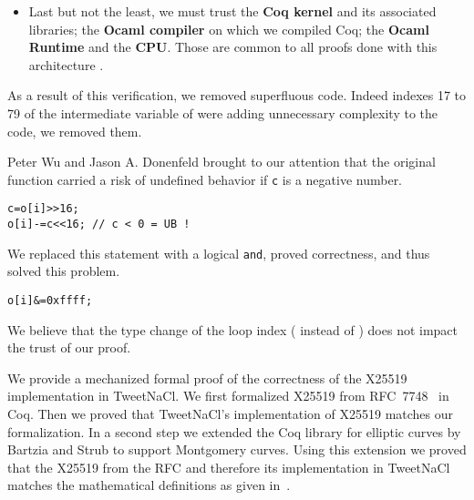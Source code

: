 \begin{itemize}
  \item Last but not the least, we must trust the \textbf{Coq kernel} and its
  associated libraries; the \textbf{Ocaml compiler} on which we compiled Coq;
  the \textbf{Ocaml Runtime} and the \textbf{CPU}. Those are common to all proofs
  done with this architecture \cite{2015-Appel,coq-faq}.
\end{itemize}

As a result of this verification, we removed superfluous code.
Indeed indexes 17 to 79 of the  intermediate variable of
 were adding unnecessary complexity to the code,
we removed them.

Peter Wu and Jason A. Donenfeld brought to our attention that the original
 function carried a risk of undefined behavior if \texttt{c}
is a negative number.
\begin{lstlisting}[language=Ctweetnacl]
c=o[i]>>16;
o[i]-=c<<16; // c < 0 = UB !
\end{lstlisting}
We replaced this statement with a logical \texttt{and}, proved correctness,
and thus solved this problem.
\begin{lstlisting}[language=Ctweetnacl]
o[i]&=0xffff;
\end{lstlisting}

We believe that the type change of the loop index ( instead of )
does not impact the trust of our proof.

We provide a mechanized formal proof of the correctness of the X25519
implementation in TweetNaCl.
We first formalized X25519 from RFC~7748~\cite{rfc7748} in Coq. Then we proved
that TweetNaCl's implementation of X25519 matches our formalization.
In a second step we extended the Coq library for elliptic curves \cite{BartziaS14}
by Bartzia and Strub to support Montgomery curves. Using this extension we
proved that the X25519 from the RFC and therefore its implementation in TweetNaCl matches
the mathematical definitions as given in~\cite[Sec.~2]{Ber06}.
